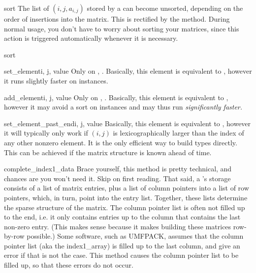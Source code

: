 \begin{methoddesc}[SparseBuildMatrix]{sort}{}
  The list of $(i,j,a_{i,j})$ stored by a 
  can become unsorted, depending on the order of insertions into the
  matrix.  This is rectified by the  method. During
  normal usage, you don't have to worry about sorting your matrices,
  since this action is triggered automatically whenever it is
  necessary.
\end{methoddesc}{sort}
\begin{methoddesc}[Matrix]{set_element}{i, j, value}
  Only on , . Basically,
  this element is equivalent to ,
  however it runs slightly faster on 
  instances.
\end{methoddesc}
\begin{methoddesc}[Matrix]{add_element}{i, j, value}
  Only on , . Basically,
  this element is equivalent to ,
  however it may avoid a sort on 
  instances and may thus run \em{significantly} faster.
\end{methoddesc}
\begin{methoddesc}[Matrix]{set_element_past_end}{i, j, value}
  Basically, this element is equivalent to ,
  however it will typically only work if $(i,j)$ is lexicographically
  larger than the index of any other nonzero element. It is the only
  efficient way to build  types
  directly. This can be achieved if the matrix structure is known
  ahead of time.
\end{methoddesc}
\begin{methoddesc}[SparseExecuteMatrix]{complete_index1_data}{}
  Brace yourself, this method is pretty technical, and chances are
  you won't need it. Skip on first reading. That said,  a 
  's storage consists of a list of 
  matrix entries, plus a list of column pointers into a list 
  of row pointers, which, in turn, point into the entry list.
  Together, these lists determine the sparse structure of the
  matrix. The column pointer list is often not filled up 
  to the end, i.e. it only contains entries up to the column
  that contains the last non-zero entry. (This makes sense
  because it makes building these matrices row-by-row possible.)
  Some software, such as UMFPACK, assumes that the column pointer
  list (aka the index1_array) is filled up to the last column,
  and give an error if that is not the case. This method
  causes the column pointer list to be filled up, so that
  these errors do not occur.
\end{methoddesc}

